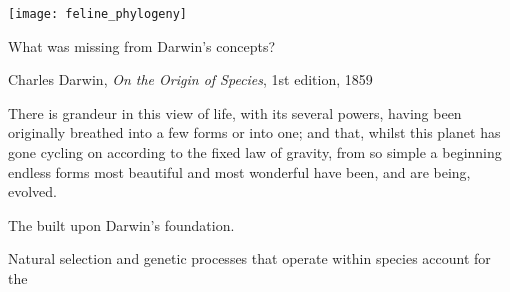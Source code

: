 \documentclass[t,handout]{beamer}  %
\begin{document}
{
\begin{frame}[t]{}
\end{frame}
}


{
\begin{frame}[t]{}
\end{frame}
}

\begin{frame}
\centering
\texttt{[image: feline\_phylogeny]} %
\vfilll
\end{frame}

{
	\begin{frame}[t]{}
\end{frame}
}

\begin{frame}[t]{What was missing from Darwin's concepts?}
\vspace{-\baselineskip}
\begin{multicols}{2}
\bigskip


\vspace{7\baselineskip}

Charles Darwin, \textit{On the Origin of Species}, 1st edition, 1859

	\columnbreak
	\begin{displayquote}There is grandeur in this view of life, with its several powers, having been originally breathed into a few forms or into one; and that, whilst this planet has gone cycling on according to the fixed law of gravity, from so simple a beginning endless forms most beautiful and most wonderful have been, and are being, evolved.\end{displayquote}
	
	
\end{multicols}
\end{frame}

\begin{frame}{The  built upon Darwin's foundation.}

\hangpara Natural selection and genetic processes that operate within species account for the 

\end{frame}
\end{document}
